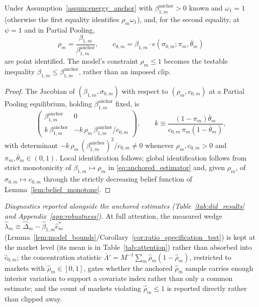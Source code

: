 \begin{proposition}
\label{prop:anchored_identification}
Under Assumption~\ref{assum:energy_anchor} with $\beta_{1,m}^{\mathrm{anchor}}>0$ known and $\omega_1=1$ (otherwise the first equality identifies $\rho_m\omega_1$), and, for the second equality, at $\psi=1$ and in Partial Pooling,
\begin{equation}
    \rho_m=\frac{\beta_{1,m}}{\beta_{1,m}^{\mathrm{anchor}}}, \qquad
    c_{0,m}=\beta_{1,m}\cdot e(\sigma_{0,m};\pi_m,\bar\theta_m)
    \label{eq:anchored_estimator}
\end{equation}
are point identified. The model's constraint $\rho_m\le1$ becomes the testable inequality
$\beta_{1,m}\le\beta_{1,m}^{\mathrm{anchor}}$, rather than an imposed clip.
\end{proposition}

\begin{proof}
The Jacobian of $(\beta_{1,m},\sigma_{0,m})$ with respect to $(\rho_m,c_{0,m})$ at a Partial
Pooling equilibrium, holding $\beta_{1,m}^{\mathrm{anchor}}$ fixed, is
\[
\begin{pmatrix}
\beta_{1,m}^{\mathrm{anchor}} & 0 \\[2pt]
k\,\beta_{1,m}^{\mathrm{anchor}} & -k\,\rho_m\,\beta_{1,m}^{\mathrm{anchor}}/c_{0,m}
\end{pmatrix},
\qquad
k\equiv\frac{(1-\pi_m)\bar\theta_m}{c_{0,m}\,\pi_m(1-\bar\theta_m)},
\]
with determinant $-k\,\rho_m\,(\beta_{1,m}^{\mathrm{anchor}})^2/c_{0,m}\ne0$ whenever
$\rho_m,c_{0,m}>0$ and $\pi_m,\bar\theta_m\in(0,1)$. Local identification follows; global
identification follows from strict monotonicity of $\beta_{1,m}\mapsto\rho_m$ in
\eqref{eq:anchored_estimator} and, given $\rho_m$, of $\sigma_{0,m}\mapsto c_{0,m}$ through the
strictly decreasing belief function of Lemma~\ref{lem:belief_monotone}.
\end{proof}

\medskip
\noindent\textit{Diagnostics reported alongside the anchored estimates
(Table~\ref{tab:did_results} and Appendix~\ref{app:robustness}).} At full attention, the measured wedge
$\hat\lambda_m\equiv\hat\Delta_m-\hat\beta_{1,m}\hat e^*_m$
(Lemma~\ref{lem:model_bounds}/Corollary~\ref{cor:ratio_specification_test}) is kept at the market level
(its mean is in Table~\ref{tab:attention}) rather than absorbed into $\hat c_{0,m}$; the concentration statistic
$\bar\Lambda'=M^{-1}\sum_m\hat\rho_m(1-\hat\rho_m)$, restricted to markets with
$\hat\rho_m\in[0,1]$, gates whether the anchored $\hat\rho_m$ sample carries enough interior
variation to support a covariate index rather than only a common estimate; and the count of
markets violating $\hat\rho_m\le1$ is reported directly rather than clipped away.

